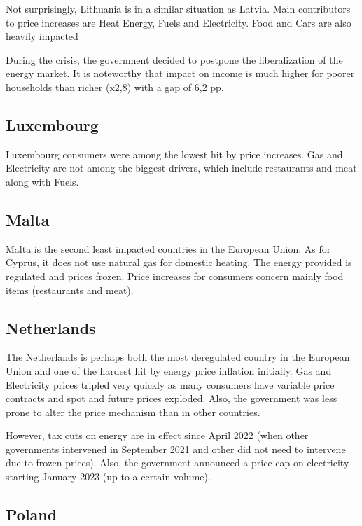 \documentclass[
  9pt,
  a4paper,
  numbers=noendperiod,
  DIV=12]{scrartcl}
\begin{document}
Not surprisingly, Lithuania is in a similar situation as Latvia. Main
contributors to price increases are Heat Energy, Fuels and Electricity.
Food and Cars are also heavily impacted

During the crisis, the government decided to postpone the liberalization
of the energy market. It is noteworthy that impact on income is much
higher for poorer households than richer (x2,8) with a gap of 6,2 pp.

\hypertarget{luxembourg}{%
\subsection{Luxembourg}\label{luxembourg}}

Luxembourg consumers were among the lowest hit by price increases. Gas
and Electricity are not among the biggest drivers, which include
restaurants and meat along with Fuels.

\hypertarget{malta}{%
\subsection{Malta}\label{malta}}

Malta is the second least impacted countries in the European Union. As
for Cyprus, it does not use natural gas for domestic heating. The energy
provided is regulated and prices frozen. Price increases for consumers
concern mainly food items (restaurants and meat).

\hypertarget{netherlands}{%
\subsection{Netherlands}\label{netherlands}}

The Netherlands is perhaps both the most deregulated country in the
European Union and one of the hardest hit by energy price inflation
initially. Gas and Electricity prices tripled very quickly as many
consumers have variable price contracts and spot and future prices
exploded. Also, the government was less prone to alter the price
mechanism than in other countries.

However, tax cuts on energy are in effect since April 2022 (when other
governments intervened in September 2021 and other did not need to
intervene due to frozen prices). Also, the government announced a price
cap on electricity starting January 2023 (up to a certain volume).

\hypertarget{poland}{%
\subsection{Poland}\label{poland}}
\end{document}
